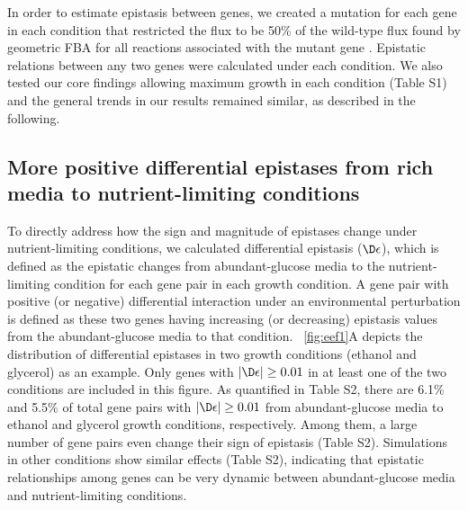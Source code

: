 In order to estimate epistasis between genes, we
created a mutation for each gene in each condition that restricted the
flux to be 50\% of the wild-type flux found by geometric FBA for all
reactions associated with the mutant gene \citep{Xu2012}. Epistatic relations
between any two genes were calculated under each condition. We also
tested our core findings allowing maximum growth in each condition
(Table S1) and the general trends in our results remained similar, as
described in the following.

\subsection{More positive differential epistases from rich media to
nutrient-limiting conditions}

To directly address how the sign and magnitude of epistases change
under nutrient-limiting conditions, we calculated differential
epistasis ($\D\epsilon$), which is defined as the epistatic changes from
abundant-glucose media to the nutrient-limiting condition for each
gene pair in each growth condition. A gene pair with positive (or
negative) differential interaction under an environmental perturbation
is defined as these two genes having increasing (or decreasing)
epistasis values from the abundant-glucose media to that
condition. \Fig~\ref{fig:eef1}A depicts the
distribution of differential
epistases in two growth conditions (ethanol and glycerol) as an
example. Only genes with $\left|\D\epsilon\right| \geq 0.01$ in at least
one of the two conditions are included in this figure. As quantified
in Table S2, there are 6.1\% and 5.5\% of total gene pairs with
$\left|\D\epsilon\right| \geq 0.01$ from abundant-glucose media to ethanol
and glycerol growth conditions, respectively. Among them, a large
number of gene pairs even change their sign of epistasis (Table
S2). Simulations in other conditions show similar effects (Table S2),
indicating that epistatic relationships among genes can be very
dynamic between abundant-glucose media and nutrient-limiting
conditions.


